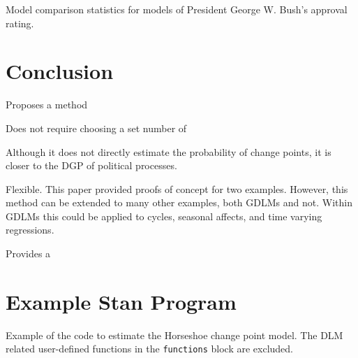 \begin{table}[thbp!]
  \centering
  
  \caption{Model comparison statistics for models of President George W. Bush's approval rating.}
  \label{dlm:tab:bush_model_comp}
\end{table}



\section{Conclusion}
\label{dlm:sec:conclusion}


Proposes a method

Does not require choosing a set number of 

Although it does not directly estimate the probability of change points, it is closer to the DGP of political processes.

Flexible.
This paper provided proofs of concept for two examples. 
However, this method can be extended to many other examples, both GDLMs and not.
Within GDLMs this could be applied to cycles, seasonal affects, and time varying regressions.


Provides a 




\section{Example Stan Program}
\label{dlm:sec:example-stan-program}

Example of the code to estimate the Horseshoe change point model.
The DLM related user-defined functions in the \texttt{functions} block are excluded.


\inputminted[firstline=5,style=bw]{stan}{../dlm-shrinkage/stan/changepoint_horseshoe.stan.mustache}  


